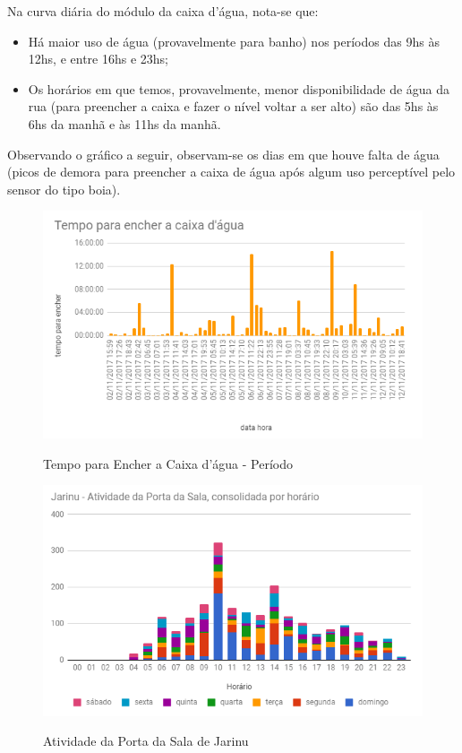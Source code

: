 Na curva diária do módulo da caixa d’água, nota-se que:

\begin{itemize}
	\item Há maior uso de água (provavelmente para banho) nos períodos das 9hs às 12hs, e entre 16hs e 23hs;
	\item Os horários em que temos, provavelmente, menor disponibilidade de água da rua (para preencher a caixa e fazer o nível voltar a ser alto) são das 5hs às 6hs da manhã e às 11hs da manhã.
	
\end{itemize}

Observando o gráfico a seguir, observam-se os dias em que houve falta de água (picos de demora para preencher a caixa de água após algum uso perceptível pelo sensor do tipo boia).

\begin{figure}[H]
	\centering
	\caption{Tempo para Encher a Caixa d'água - Período}
	\includegraphics[width=1.0\textwidth]{tempoPeriodocxAgua}
	\label{fig:tempoPeriodocxAgua}
\end{figure}

\begin{figure}[H]
	\centering
	\caption{Atividade da Porta da Sala de Jarinu}
	\includegraphics[width=1.0\textwidth]{AtivPortaSalaJarinu}
	\label{fig:AtivPortaSalaJarinu}
\end{figure}

